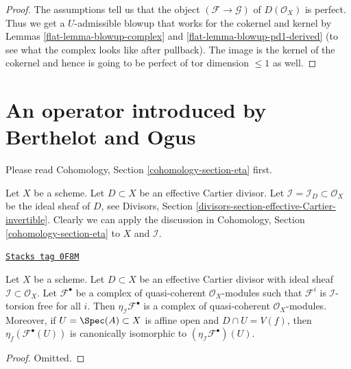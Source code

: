 \begin{proof}

The assumptions tell us that the object $(\mathcal{F} \to \mathcal{G})$
of $D(\mathcal{O}_X)$ is perfect. Thus we get a $U$-admissible blowup that
works for the cokernel and kernel by Lemmas \ref{flat-lemma-blowup-complex}
and \ref{flat-lemma-blowup-pd1-derived} (to see what the complex looks
like after pullback). The image is the kernel of the cokernel
and hence is going to be perfect of tor dimension $\leq 1$ as well.
\end{proof}

\section{An operator introduced by Berthelot and Ogus}
\label{flat-section-eta}
Please read Cohomology, Section \ref{cohomology-section-eta} first.

\medskip\noindent
Let $X$ be a scheme. Let $D \subset X$ be an effective
Cartier divisor. Let $\mathcal{I} = \mathcal{I}_D \subset \mathcal{O}_X$
be the ideal sheaf of $D$, see
Divisors, Section
\ref{divisors-section-effective-Cartier-invertible}.
Clearly we can apply the discussion in
Cohomology, Section \ref{cohomology-section-eta} to $X$ and $\mathcal{I}$.

\begin{lemma}
\label{flat-lemma-eta-stalks}
\href{https://stacks.math.columbia.edu/tag/0F8M}{\texttt{Stacks tag 0F8M}}

Let $X$ be a scheme. Let $D \subset X$ be an effective
Cartier divisor with ideal sheaf $\mathcal{I} \subset \mathcal{O}_X$.
Let $\mathcal{F}^\bullet$ be a complex of quasi-coherent
$\mathcal{O}_X$-modules such that $\mathcal{F}^i$ is
$\mathcal{I}$-torsion free for all $i$. Then
$\eta_\mathcal{I}\mathcal{F}^\bullet$ is a complex of
quasi-coherent $\mathcal{O}_X$-modules. Moreover,
if $U = \Spec(A) \subset X$ is affine open and $D \cap U = V(f)$,
then $\eta_f(\mathcal{F}^\bullet(U))$ is canonically isomorphic
to $(\eta_\mathcal{I}\mathcal{F}^\bullet)(U)$.
\end{lemma}

\begin{proof}
Omitted.
\end{proof}

